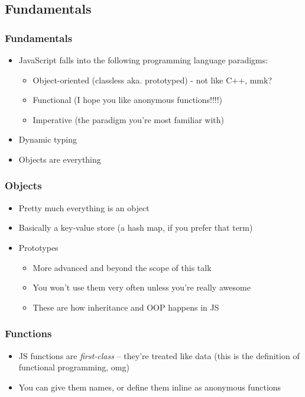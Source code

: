 \documentclass[10pt]{beamer}
\begin{document}
\subsection{Fundamentals}
\frame
{
  \frametitle{Fundamentals}

  \begin{itemize}
    \item JavaScript falls into the following programming language paradigms:
      \begin{itemize}
        \item Object-oriented (classless aka. prototyped) - not like C++, mmk?
        \item Functional (I hope you like anonymous functions!!!!)
        \item Imperative (the paradigm you're most familiar with)
      \end{itemize}
    \item Dynamic typing
    \item Objects are everything
  \end{itemize}
}

\frame
{
  \frametitle{Objects}

  \begin{itemize}
    \item Pretty much everything is an object
    \item Basically a key-value store (a hash map, if you prefer that term)
    \item Prototypes
      \begin{itemize}
        \item More advanced and beyond the scope of this talk
        \item You won't use them very often unless you're really awesome
        \item These are how inheritance and OOP happens in JS
      \end{itemize}
  \end{itemize}
}

\frame
{
  \frametitle{Functions}
  
  \begin{itemize}
    \item JS functions are \emph{first-class} -- they're treated like data (this is the definition of functional programming, omg)
    \item You can give them names, or define them inline as anonymous functions
  \end{itemize}
}
\end{document}
